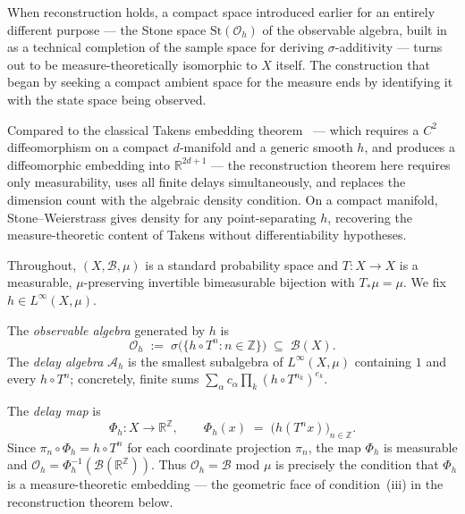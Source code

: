 When reconstruction holds, a compact space introduced earlier for an entirely
different purpose — the Stone space $\mathrm{St}(\mathcal{O}_h)$ of the
observable algebra, built in~\cite{mahon_paper1} as a technical completion of
the sample space for deriving $\sigma$-additivity — turns out to be
measure-theoretically isomorphic to $X$ itself.  The construction that began
by seeking a compact ambient space for the measure ends by identifying it with
the state space being observed.

Compared to the classical Takens embedding theorem~\cite{Takens1981} — which
requires a $C^2$ diffeomorphism on a compact $d$-manifold and a generic smooth
$h$, and produces a diffeomorphic embedding into $\mathbb{R}^{2d+1}$ — the
reconstruction theorem here requires only measurability, uses all finite delays
simultaneously, and replaces the dimension count with the algebraic density
condition.  On a compact manifold, Stone--Weierstrass gives density for any
point-separating $h$, recovering the measure-theoretic content of Takens
without differentiability hypotheses.

Throughout, $(X, \mathcal{B}, \mu)$ is a standard probability space and
$T : X \to X$ is a measurable, $\mu$-preserving invertible bimeasurable
bijection with $T_*\mu = \mu$.  We fix $h \in L^\infty(X, \mu)$.

\begin{definition}
\label{def:obs-algebra}
The \emph{observable algebra} generated by $h$ is
\[
  \mathcal{O}_h \;:=\; \sigma\!\bigl(\{h \circ T^n : n \in \mathbb{Z}\}\bigr)
  \;\subseteq\; \mathcal{B}(X).
\]
The \emph{delay algebra} $\mathcal{A}_h$ is the smallest subalgebra of
$L^\infty(X, \mu)$ containing $1$ and every $h \circ T^n$; concretely, finite
sums $\sum_\alpha c_\alpha \prod_k (h \circ T^{n_k})^{e_k}$.
\end{definition}

\begin{definition}
\label{def:delay-map}
The \emph{delay map} is
\[
  \Phi_h : X \to \mathbb{R}^\mathbb{Z},
  \qquad
  \Phi_h(x) \;=\; \bigl(h(T^n x)\bigr)_{n \in \mathbb{Z}}.
\]
Since $\pi_n \circ \Phi_h = h \circ T^n$ for each coordinate projection $\pi_n$,
the map $\Phi_h$ is measurable and
$\mathcal{O}_h = \Phi_h^{-1}(\mathcal{B}(\mathbb{R}^\mathbb{Z}))$.
Thus $\mathcal{O}_h = \mathcal{B}$ mod $\mu$ is precisely the condition that
$\Phi_h$ is a measure-theoretic embedding — the geometric face of
condition~(iii) in the reconstruction theorem below.
\end{definition}

